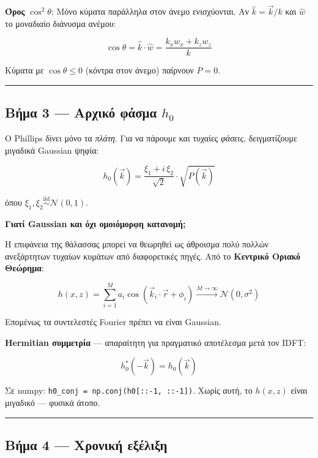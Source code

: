 \documentclass[a4paper, 11pt]{article}
\begin{document}
\textbf{Όρος} \(\cos^2\theta\): Μόνο κύματα παράλληλα στον άνεμο
ενισχύονται. Αν \(\hat{k} = \vec{k}/k\) και \(\hat{w}\) το μοναδιαίο
διάνυσμα ανέμου:

\[\cos\theta = \hat{k} \cdot \hat{w} = \frac{k_x w_x + k_z w_z}{k}\]

Κύματα με \(\cos\theta \leq 0\) (κόντρα στον άνεμο) παίρνουν \(P = 0\).

\begin{center}\rule{0.5\linewidth}{0.5pt}\end{center}

\subsection{\texorpdfstring{Βήμα 3 --- Αρχικό φάσμα
\(h_0\)}{Βήμα 3 --- Αρχικό φάσμα h\_0}}\label{ux3b2ux3aeux3bcux3b1-3-ux3b1ux3c1ux3c7ux3b9ux3baux3cc-ux3c6ux3acux3c3ux3bcux3b1-h_0}

Ο Phillips δίνει μόνο τα \emph{πλάτη}. Για να πάρουμε και τυχαίες
\emph{φάσεις}, δειγματίζουμε μιγαδικά Gaussian ψηφία:

\[\boxed{h_0(\vec{k}) = \frac{\xi_1 + i\,\xi_2}{\sqrt{2}} \cdot \sqrt{P(\vec{k})}}\]

όπου \(\xi_1, \xi_2 \overset{\text{iid}}{\sim} \mathcal{N}(0,1)\).

\textbf{Γιατί Gaussian και όχι ομοιόμορφη κατανομή;}

Η επιφάνεια της θάλασσας μπορεί να θεωρηθεί ως άθροισμα πολύ πολλών
ανεξάρτητων τυχαίων κυμάτων από διαφορετικές πηγές. Από το
\textbf{Κεντρικό Οριακό Θεώρημα}:

\[h(x,z) = \sum_{i=1}^{M} a_i \cos(\vec{k}_i \cdot \vec{r} + \phi_i) \xrightarrow{M\to\infty} \mathcal{N}(0, \sigma^2)\]

Επομένως τα συντελεστές Fourier πρέπει να είναι Gaussian.

\textbf{Hermitian συμμετρία} --- απαραίτητη για πραγματικό αποτέλεσμα
μετά τον IDFT:

\[h_0^*(-\vec{k}) = h_0(\vec{k})\]

Σε numpy: \texttt{h0\_conj\ =\ np.conj(h0{[}::-1,\ ::-1{]})}. Χωρίς
αυτή, το \(h(x,z)\) είναι μιγαδικό --- φυσικά άτοπο.

\begin{center}\rule{0.5\linewidth}{0.5pt}\end{center}

\subsection{Βήμα 4 --- Χρονική
εξέλιξη}\label{ux3b2ux3aeux3bcux3b1-4-ux3c7ux3c1ux3bfux3bdux3b9ux3baux3ae-ux3b5ux3beux3adux3bbux3b9ux3beux3b7}
\end{document}
